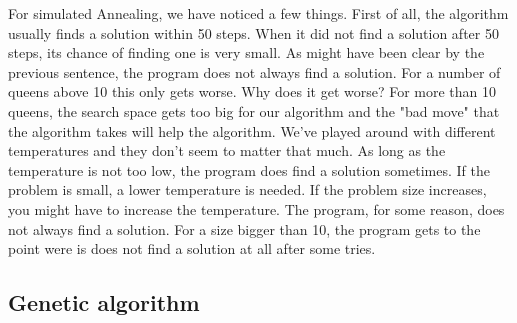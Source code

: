 \documentclass{article}
\begin{document}
	For simulated Annealing, we have noticed a few things. First of all, the algorithm usually finds a solution within 50 steps. When it did not find a solution after 50 steps, its chance of finding one is very small. As might have been clear by the previous sentence, the program does not always find a solution. For a number of queens above 10 this only gets worse. Why does it get worse? For more than 10 queens, the search space gets too big for our algorithm and the "bad move" that the algorithm takes will help the algorithm. We've played around with different temperatures and they don't seem to matter that much. As long as the temperature is not too low, the program does find a solution sometimes. If the problem is small, a lower temperature is needed. If the problem size increases, you might have to increase the temperature. The program, for some reason, does not always find a solution. For a size bigger than 10, the program gets to the point were is does not find a solution at all after some tries. 
	
	
	\subsection{Genetic algorithm}
	
\end{document}
